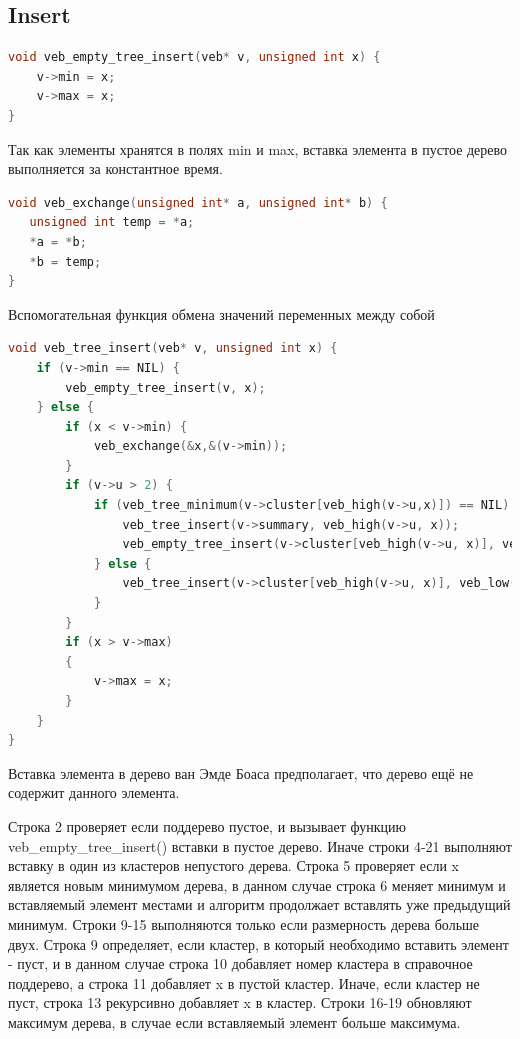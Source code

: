 \documentclass{article}
\begin{document}
\subsection{Insert}
\begin{lstlisting}[language=C,style=C]
void veb_empty_tree_insert(veb* v, unsigned int x) {
    v->min = x;
    v->max = x;
}
\end{lstlisting}
Так как элементы хранятся в полях min и max, вставка элемента в пустое дерево выполняется за константное время.
\begin{lstlisting}[language=C,style=C]
void veb_exchange(unsigned int* a, unsigned int* b) {
   unsigned int temp = *a;
   *a = *b;
   *b = temp;
}
\end{lstlisting}
Вспомогательная функция обмена значений переменных между собой
\begin{lstlisting}[language=C,style=C]
void veb_tree_insert(veb* v, unsigned int x) {
    if (v->min == NIL) {
        veb_empty_tree_insert(v, x);
    } else {
        if (x < v->min) { 
            veb_exchange(&x,&(v->min));
        }
        if (v->u > 2) {
            if (veb_tree_minimum(v->cluster[veb_high(v->u,x)]) == NIL) {
                veb_tree_insert(v->summary, veb_high(v->u, x));
                veb_empty_tree_insert(v->cluster[veb_high(v->u, x)], veb_low(v->u, x));
            } else {
                veb_tree_insert(v->cluster[veb_high(v->u, x)], veb_low(v->u, x));
            }
        }
        if (x > v->max)
        {
            v->max = x;
        }
    }
}
\end{lstlisting}

Вставка элемента в дерево ван Эмде Боаса предполагает, что дерево ещё не содержит данного элемента.

Строка 2 проверяет если поддерево пустое, и вызывает функцию veb\_empty\_tree\_insert() вставки в пустое дерево. Иначе строки 4-21 выполняют вставку в один из кластеров непустого дерева. Строка 5 проверяет если x является новым минимумом дерева, в данном случае строка 6 меняет минимум и вставляемый элемент местами и алгоритм продолжает вставлять уже предыдущий минимум. Строки 9-15 выполняются только если размерность дерева больше двух. Строка 9 определяет, если кластер, в который необходимо вставить элемент - пуст, и в данном случае строка 10 добавляет номер кластера в справочное поддерево, а строка 11 добавляет x в пустой кластер. Иначе, если кластер не пуст, строка 13 рекурсивно добавляет x в кластер. Строки 16-19 обновляют максимум дерева, в случае если вставляемый элемент больше максимума. \cite{ita}
\end{document}

